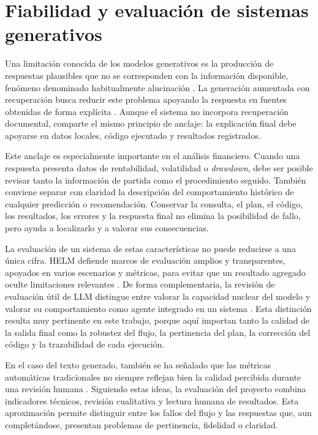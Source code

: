 \section{Fiabilidad y evaluaci\'on de sistemas generativos}

Una limitaci\'on conocida de los modelos generativos es la producci\'on de respuestas plausibles que no se corresponden con la informaci\'on disponible, fen\'omeno 
denominado habitualmente alucinaci\'on \cite{ji2022hallucination}. La generaci\'on aumentada con recuperaci\'on busca reducir este problema apoyando la respuesta en 
fuentes obtenidas de forma expl\'icita \cite{lewis2020rag}. Aunque el sistema no incorpora recuperaci\'on documental, comparte el mismo principio de anclaje: la 
explicaci\'on final debe apoyarse en datos locales, c\'odigo ejecutado y resultados registrados.

Este anclaje es especialmente importante en el an\'alisis financiero. Cuando una respuesta presenta datos de rentabilidad, volatilidad o \textit{drawdown}, debe ser 
posible revisar tanto la informaci\'on de partida como el procedimiento seguido. Tambi\'en conviene separar con claridad la descripci\'on del comportamiento hist\'orico 
de cualquier predicci\'on o recomendaci\'on. Conservar la consulta, el plan, el c\'odigo, los resultados, los errores y la respuesta final no elimina la posibilidad de 
fallo, pero ayuda a localizarlo y a valorar sus consecuencias.

La evaluaci\'on de un sistema de estas caracter\'isticas no puede reducirse a una \'unica cifra. HELM defiende marcos de evaluaci\'on amplios y transparentes, apoyados 
en varios escenarios y m\'etricas, para evitar que un resultado agregado oculte limitaciones relevantes \cite{liang2022helm}. De forma complementaria, la revisi\'on de 
evaluaci\'on \'util de LLM distingue entre valorar la capacidad nuclear del modelo y valorar su comportamiento como agente integrado en un sistema \cite{peng2024usefuleval}. 
Esta distinci\'on resulta muy pertinente en este trabajo, porque aqu\'i importan tanto la calidad de la salida final como la robustez del flujo, la pertinencia del plan, 
la correcci\'on del c\'odigo y la trazabilidad de cada ejecuci\'on.

En el caso del texto generado, tambi\'en se ha se\~nalado que las m\'etricas autom\'aticas tradicionales no siempre reflejan bien la calidad percibida durante una 
revisi\'on humana \cite{liu2023geval}. Siguiendo estas ideas, la evaluaci\'on del proyecto combina indicadores t\'ecnicos, revisi\'on cualitativa y lectura humana de 
resultados. Esta aproximaci\'on permite distinguir entre los fallos del flujo y las respuestas que, aun complet\'andose, presentan problemas de pertinencia, fidelidad o 
claridad.

